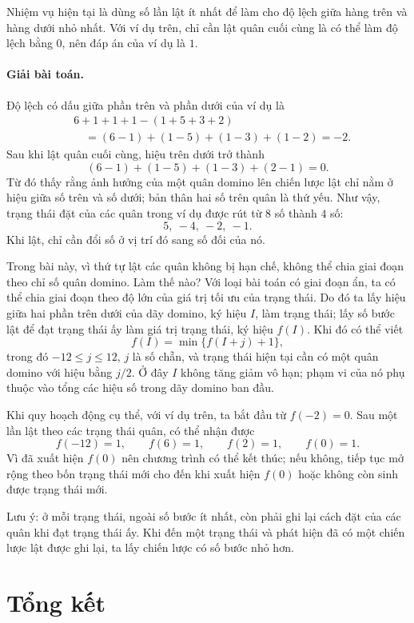 \documentclass[11pt]{article}
\begin{document}
Nhiệm vụ hiện tại là dùng số lần lật ít nhất để làm cho độ lệch giữa hàng
trên và hàng dưới nhỏ nhất. Với ví dụ trên, chỉ cần lật quân cuối cùng là có
thể làm độ lệch bằng $0$, nên đáp án của ví dụ là $1$.

\paragraph{Giải bài toán.}
Độ lệch có dấu giữa phần trên và phần dưới của ví dụ là
\[
\begin{aligned}
&6+1+1+1-(1+5+3+2)\\
&\quad=(6-1)+(1-5)+(1-3)+(1-2)=-2.
\end{aligned}
\]
Sau khi lật quân cuối cùng, hiệu trên dưới trở thành
\[
  (6-1)+(1-5)+(1-3)+(2-1)=0.
\]
Từ đó thấy rằng ảnh hưởng của một quân domino lên chiến lược lật chỉ nằm ở
hiệu giữa số trên và số dưới; bản thân hai số trên quân là thứ yếu. Như vậy,
trạng thái đặt của các quân trong ví dụ được rút từ $8$ số thành $4$ số:
\[
  5,\ -4,\ -2,\ -1.
\]
Khi lật, chỉ cần đổi số ở vị trí đó sang số đối của nó.

Trong bài này, vì thứ tự lật các quân không bị hạn chế, không thể chia giai
đoạn theo chỉ số quân domino. Làm thế nào? Với loại bài toán có giai đoạn ẩn,
ta có thể chia giai đoạn theo độ lớn của giá trị tối ưu của trạng thái. Do đó
ta lấy hiệu giữa hai phần trên dưới của dãy domino, ký hiệu $I$, làm trạng
thái; lấy số bước lật để đạt trạng thái ấy làm giá trị trạng thái, ký hiệu
$f(I)$. Khi đó có thể viết
\[
  f(I)=\min\{f(I+j)+1\},
\]
trong đó $-12\le j\le 12$, $j$ là số chẵn, và trạng thái hiện tại cần có một
quân domino với hiệu bằng $j/2$. Ở đây $I$ không tăng giảm vô hạn; phạm vi
của nó phụ thuộc vào tổng các hiệu số trong dãy domino ban đầu.

Khi quy hoạch động cụ thể, với ví dụ trên, ta bắt đầu từ $f(-2)=0$. Sau một
lần lật theo các trạng thái quân, có thể nhận được
\[
  f(-12)=1,\qquad f(6)=1,\qquad f(2)=1,\qquad f(0)=1.
\]
Vì đã xuất hiện $f(0)$ nên chương trình có thể kết thúc; nếu không, tiếp tục
mở rộng theo bốn trạng thái mới cho đến khi xuất hiện $f(0)$ hoặc không còn
sinh được trạng thái mới.

Lưu ý: ở mỗi trạng thái, ngoài số bước ít nhất, còn phải ghi lại cách đặt của
các quân khi đạt trạng thái ấy. Khi đến một trạng thái và phát hiện đã có một
chiến lược lật được ghi lại, ta lấy chiến lược có số bước nhỏ hơn.

\section{Tổng kết}
\end{document}
